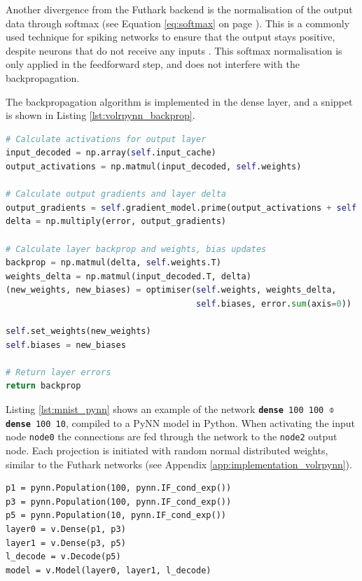 Another divergence from the Futhark backend is the normalisation of the
output data through softmax
(see Equation \ref{eq:softmax} on page \pageref{eq:softmax}).
This is a commonly used technique for spiking networks to ensure that the 
output stays positive, despite neurons that do not receive any inputs 
\cite{Rueckauer2017}.
This softmax normalisation is only applied in the feedforward step, and does
not interfere with the backpropagation.

The backpropagation algorithm is implemented in the dense layer, and a snippet
is shown in Listing \ref{lst:volrpynn_backprop}.

\begin{lstlisting}[language=Python,label={lst:volrpynn_backprop},caption={Part
of the backpropagation algorithm implemented in PyNN.}]
# Calculate activations for output layer
input_decoded = np.array(self.input_cache)
output_activations = np.matmul(input_decoded, self.weights)

# Calculate output gradients and layer delta
output_gradients = self.gradient_model.prime(output_activations + self.biases)
delta = np.multiply(error, output_gradients)

# Calculate layer backprop and weights, bias updates
backprop = np.matmul(delta, self.weights.T)
weights_delta = np.matmul(input_decoded.T, delta)
(new_weights, new_biases) = optimiser(self.weights, weights_delta,
                                      self.biases, error.sum(axis=0))

self.set_weights(new_weights)
self.biases = new_biases

# Return layer errors
return backprop
\end{lstlisting}

Listing \ref{lst:mnist_pynn} shows an example of the network
\texttt{\textbf{dense} 100 100 $\obar$ \textbf{dense} 100 10}, compiled to a PyNN model in Python.
When activating the input node \texttt{node0} the connections are fed through
the network to the \texttt{node2} output node.
Each projection is initiated with random normal distributed weights, similar
to the Futhark networks (see Appendix \ref{app:implementation_volrpynn}).

\begin{lstlisting}[caption={A simple MNIST network in the PyNN backend from the network in figure
    \ref{fig:volr-examples} on page \pageref{fig:volr-examples}.
    The neuron parameters for the LIF populations have been
omitted.},label={lst:mnist_pynn}]
p1 = pynn.Population(100, pynn.IF_cond_exp())
p3 = pynn.Population(100, pynn.IF_cond_exp())
p5 = pynn.Population(10, pynn.IF_cond_exp())
layer0 = v.Dense(p1, p3)
layer1 = v.Dense(p3, p5)
l_decode = v.Decode(p5)
model = v.Model(layer0, layer1, l_decode)
\end{lstlisting}

